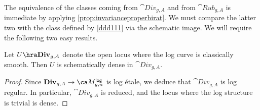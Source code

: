 The equivalence of the classes coming from $\cat{Div}_{g,A}$ and from $\cat{Rub}_{g,A}$ is immediate by applying \cref{prop:invarianceproperbirat}. We must compare
the latter two with the class defined by  \eqref{ddd111}
via the schematic image. We will require the following two easy results.
\begin{lemma}
\notready\label{lem:smooth_dense}
Let $U \hra \cat{Div}_{g,A}$ denote the open locus where the log curve is classically smooth. Then $U$ is schematically dense in $\cat{Div}_{g,A}$.
\end{lemma}
\begin{proof}
Since $\cat{Div}_{g,A} \to \ca M^{\mathsf{log}}_{g,n}$ is log \'etale, we deduce that $\cat{Div}_{g,A}$ is log regular. In particular, $\cat{Div}_{g,A}$
 is reduced,  and the locus where the log structure is trivial is dense. %
%
\end{proof}


